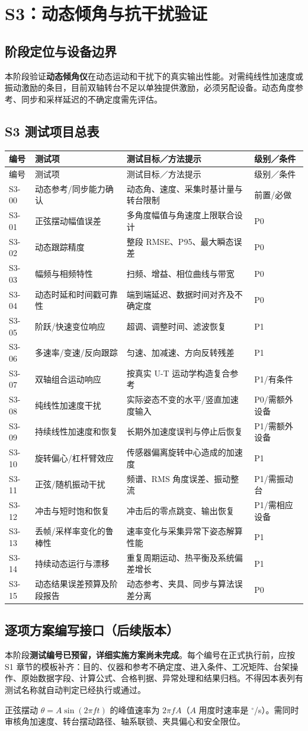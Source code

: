 \chapter{S3：动态倾角与抗干扰验证}
\section{阶段定位与设备边界}
本阶段验证\textbf{动态倾角仪}在动态运动和干扰下的真实输出性能。对需纯线性加速度或振动激励的条目，目前双轴转台不足以单独提供激励，必须另配设备。动态角度参考、同步和采样延迟的不确定度需先评估。
\section{S3 测试项目总表}
\small
\begin{longtable}{C{18mm}p{46mm}p{61mm}p{22mm}}
\toprule 编号 & 测试项 & 测试目标／方法提示 & 级别／条件\\\midrule\endfirsthead
\toprule 编号 & 测试项 & 测试目标／方法提示 & 级别／条件\\\midrule\endhead
S3-00 & 动态参考/同步能力确认 & 动态角、速度、采集时基计量与转台限制 & 前置/必做\\
S3-01 & 正弦摆动幅值误差 & 多角度幅值与角速度上限联合设计 & P0\\
S3-02 & 动态跟踪精度 & 整段 RMSE、P95、最大瞬态误差 & P0\\
S3-03 & 幅频与相频特性 & 扫频、增益、相位曲线与带宽 & P0\\
S3-04 & 动态时延和时间戳可靠性 & 端到端延迟、数据时间对齐及不确定度 & P0\\
S3-05 & 阶跃/快速变位响应 & 超调、调整时间、滤波恢复 & P1\\
S3-06 & 多速率/变速/反向跟踪 & 匀速、加减速、方向反转残差 & P1\\
S3-07 & 双轴组合运动响应 & 按真实 U-T 运动学构造复合参考 & P1/有条件\\
S3-08 & 纯线性加速度干扰 & 实际姿态不变的水平/竖直加速度输入 & P0/需额外设备\\
S3-09 & 持续线性加速度和恢复 & 长期外加速度误判与停止后恢复 & P1/需额外设备\\
S3-10 & 旋转偏心/杠杆臂效应 & 传感器偏离旋转中心造成的加速度 & P1\\
S3-11 & 正弦/随机振动干扰 & 频谱、RMS 角度误差、振动整流 & P1/需振动台\\
S3-12 & 冲击与短时饱和恢复 & 冲击后的零点跳变、输出恢复 & P1/需相应设备\\
S3-13 & 丢帧/采样率变化的鲁棒性 & 速率变化与采集异常下姿态解算性能 & P1\\
S3-14 & 持续动态运行与漂移 & 重复周期运动、热平衡及系统偏差增长 & P1\\
S3-15 & 动态结果误差预算及阶段报告 & 动态参考、夹具、同步与算法误差分离 & P0\\
\bottomrule
\end{longtable}
\normalsize
\section{逐项方案编写接口（后续版本）}
本阶段\textbf{测试编号已预留，详细实施方案尚未完成}。每个编号在正式执行前，应按 S1 章节的模板补齐：目的、仪器和参考不确定度、进入条件、工况矩阵、台架操作、原始数据字段、计算公式、合格判据、异常处理和结果归档。不得因本表列有测试名称就自动判定已经执行或通过。
\begin{warningbox}正弦摆动 $\theta=A\sin(2\pi ft)$ 的峰值速率为 $2\pi fA$（$A$ 用度时速率是 $^\circ$/s）。需同时审核角加速度、转台摆动路径、轴系联锁、夹具偏心和安全限位。\end{warningbox}
